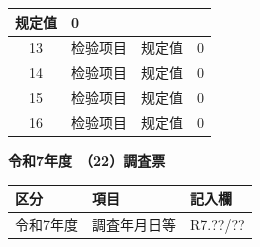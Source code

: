 \documentclass[UTF8,10pt,a4paper,fontset=fandol]{ctexart}
\newcommand{\fieldvalue}[1]{#1}
\newcommand{\handwritten}[1]{#1}
\begin{document}
\begin{tabularx}{\textwidth}{|c|X|c|X|}
规定值 &
\fieldvalue{\handwritten{0}} \\
\hline
13 & 检验项目 &
规定值 &
\fieldvalue{\handwritten{0}} \\
\hline
14 & 检验项目 &
规定值 &
\fieldvalue{\handwritten{0}} \\
\hline
15 & 检验项目 &
规定值 &
\fieldvalue{\handwritten{0}} \\
\hline
16 & 检验项目 &
规定值 &
\fieldvalue{\handwritten{0}} \\
\hline
\end{tabularx}
\normalsize


\newpage


\begin{center}
\textbf{令和7年度　（22）調査票}
\end{center}

\noindent
\begin{tabularx}{\textwidth}{|l|X|l|}
\hline
\textbf{区分} & \textbf{項目} & \textbf{記入欄}\\
\hline
令和7年度 & 調査年月日等 & 
\fieldvalue{\handwritten{R7.??/??}}\\
\hline
\end{tabularx}

\vspace{1em}
\end{document}
